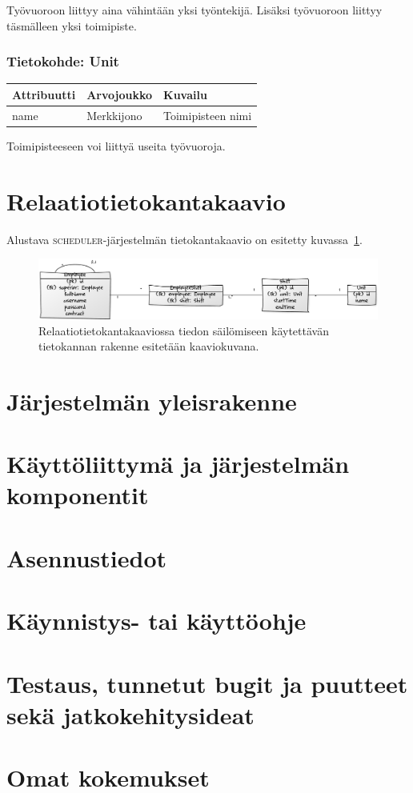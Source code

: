 \documentclass[10pt,titlepage,hidelinks]{scrartcl}
\newcommand{\scheduler}{\textsc{scheduler}}
\begin{document}
\noindent Työvuoroon liittyy aina vähintään yksi työntekijä. Lisäksi työvuoroon liittyy täsmälleen yksi toimipiste.

\subsubsection*{Tietokohde: Unit}
{\footnotesize \begin{tabu} to 
\toprule
Attribuutti & Arvojoukko & Kuvailu \\
\midrule
name & Merkkijono & Toimipisteen nimi \\
\bottomrule
\end{tabu}}\smallskip

\noindent Toimipisteeseen voi liittyä useita työvuoroja.

\section{Relaatiotietokantakaavio}

Alustava \scheduler{}-järjestelmän tietokantakaavio on esitetty kuvassa~\ref{fig:tietokantakaavio}.

\begin{figure}[tb]
\centering
\includegraphics[width=\textwidth]{af410d18}
\caption{Relaatiotietokantakaaviossa tiedon säilömiseen käytettävän tietokannan rakenne esitetään kaaviokuvana.}
\label{fig:tietokantakaavio}
\end{figure}

\section{Järjestelmän yleisrakenne}
\section{Käyttöliittymä ja järjestelmän komponentit}
\section{Asennustiedot}
\section{Käynnistys- tai käyttöohje}
\section{Testaus, tunnetut bugit ja puutteet sekä jatkokehitysideat}
\section{Omat kokemukset}
\end{document}
